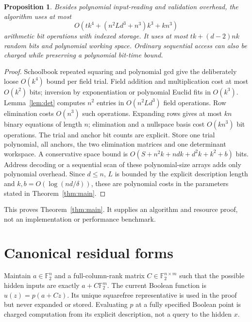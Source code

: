 \documentclass[11pt]{article}
\newtheorem{proposition}[theorem]{Proposition}
\theoremstyle{remark}\newtheorem{remark}[theorem]{Remark}
\newcommand{\F}{\mathbb F}
\begin{document}
\begin{proposition}\label{prop:bits}
Besides polynomial input-reading and validation overhead, the algorithm uses at most
\begin{equation}\label{eq:bits}
 O\!\left(tk^4+(n^2Ld^3+n^3)k^3+kn^3\right)
\end{equation}
arithmetic bit operations with indexed storage. It uses at most $tk+(d-2)nk$ random bits and polynomial working space. Ordinary sequential access can also be charged while preserving a polynomial bit-time bound.
\end{proposition}
\begin{proof}
Schoolbook repeated squaring and polynomial gcd give the deliberately loose $O(k^4)$ bound per field trial. Field addition and multiplication cost at most $O(k^2)$ bits; inversion by exponentiation or polynomial Euclid fits in $O(k^3)$.
Lemma~\ref{lem:det} computes $n^2$ entries in $O(n^2Ld^3)$ field operations. Row elimination costs $O(n^3)$ such operations. Expanding rows gives at most $kn$ binary equations of length $n$; elimination and a nullspace basis cost $O(kn^3)$ bit operations.
The trial and anchor bit counts are explicit.
Store one trial polynomial, all anchors, the two elimination matrices and one determinant workspace. A conservative space bound is $O(S+n^2k+ndk+d^2k+k^2+b)$ bits.
Address decoding or a sequential scan of these polynomial-size arrays adds only polynomial overhead. Since $d\le n$, $L$ is bounded by the explicit description length and $k,b=O(\log(nd/\delta))$, these are polynomial costs in the parameters stated in Theorem~\ref{thm:main}.
\end{proof}

This proves Theorem~\ref{thm:main}. It supplies an algorithm and resource proof, not an implementation or performance benchmark.

\section{Canonical residual forms}\label{sec:evaluator}
Maintain $a\in\F_2^n$ and a full-column-rank matrix $C\in\F_2^{n\times m}$ such that the possible hidden inputs are exactly $a+C\F_2^m$. The current Boolean function is $u(z)=p(a+Cz)$. Its unique squarefree representative is used in the proof but never expanded or stored. Evaluating $p$ at a fully specified Boolean point is charged computation from its explicit description, not a query to the hidden $x$.
\end{document}
